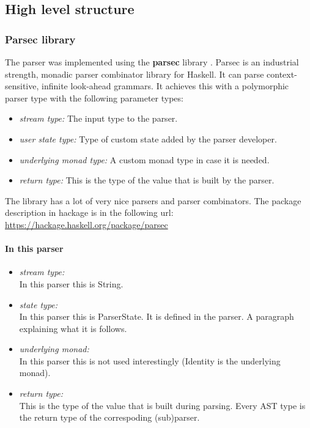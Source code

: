 \documentclass{article}
\begin{document}
\newpage
\subsection{High level structure}

\subsubsection{Parsec library}


The parser was implemented using the \textbf{parsec} library \cite{parsec}.
Parsec is an industrial strength, monadic parser combinator library for
Haskell.  It can parse context-sensitive, infinite look-ahead grammars. It
achieves this with a polymorphic parser type with the following parameter
types:

\begin{itemize}
\item
  \textit{stream type:} The input type to the parser.
\item
  \textit{user state type:} Type of custom state added by the parser developer.
\item
  \textit{underlying monad type:} A custom monad type in case it is needed.
\item
  \textit{return type:}
  This is the type of the value that is built by the parser.
\end{itemize}
The library has a lot of very nice parsers and parser combinators.
The package description in hackage is in the following url:
\url{https://hackage.haskell.org/package/parsec}

\paragraph{In this parser}
\begin{itemize}
\item
  \textit{stream type:}
  \\
  In this parser this is String.
\item
  \textit{state type:}
  \\
  In this parser this is ParserState. It is defined in the parser.
  A paragraph explaining what it is follows.
\item
  \textit{underlying monad:}
  \\
  In this parser this is not used interestingly
  (Identity is the underlying monad).
\item
  \textit{return type:}
  \\
  This is the type of the value that is built during parsing.
  Every AST type is the return type of the correspoding (sub)parser.
\end{itemize}
\end{document}
